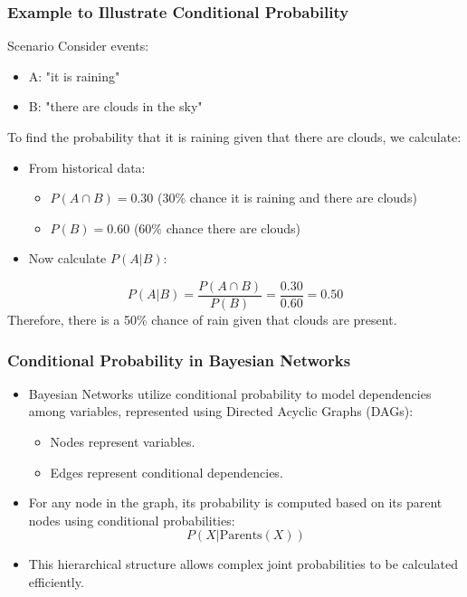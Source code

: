\documentclass[aspectratio=169]{beamer}
\begin{document}
\begin{frame}[fragile]
  \frametitle{Example to Illustrate Conditional Probability}
  \begin{block}{Scenario}
    Consider events:
    \begin{itemize}
      \item A: "it is raining"
      \item B: "there are clouds in the sky"
    \end{itemize}
  \end{block}

  To find the probability that it is raining given that there are clouds, we calculate:
  \begin{itemize}
    \item From historical data:
      \begin{itemize}
        \item \( P(A \cap B) = 0.30 \) (30\% chance it is raining and there are clouds)
        \item \( P(B) = 0.60 \) (60\% chance there are clouds)
      \end{itemize}
    \item Now calculate \( P(A | B) \):
  \end{itemize}
  \begin{equation}
  P(A | B) = \frac{P(A \cap B)}{P(B)} = \frac{0.30}{0.60} = 0.50
  \end{equation}
  Therefore, there is a 50\% chance of rain given that clouds are present.
\end{frame}

\begin{frame}[fragile]
  \frametitle{Conditional Probability in Bayesian Networks}
  \begin{itemize}
    \item Bayesian Networks utilize conditional probability to model dependencies among variables, represented using Directed Acyclic Graphs (DAGs):
      \begin{itemize}
        \item Nodes represent variables.
        \item Edges represent conditional dependencies.
      \end{itemize}
    \item For any node in the graph, its probability is computed based on its parent nodes using conditional probabilities:
    \begin{equation}
    P(X | \text{Parents}(X))
    \end{equation}
    \item This hierarchical structure allows complex joint probabilities to be calculated efficiently.
  \end{itemize}
\end{frame}
\end{document}
